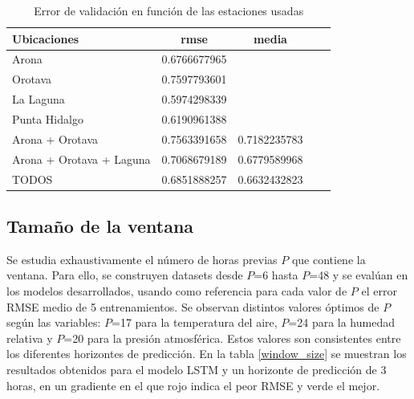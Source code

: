 \begin{table}[h!]
\centering
\begin{tabular}{lcccc}
\toprule
\textbf{Ubicaciones} & \textbf{rmse} & \textbf{media} \\
\midrule
Arona                    & 0.6766677965 & \\
Orotava                  & 0.7597793601 & \\
La Laguna                & 0.5974298339 & \\
Punta Hidalgo            & 0.6190961388 & \\
Arona + Orotava          & 0.7563391658 & 0.7182235783 \\
Arona + Orotava + Laguna & 0.7068679189 & 0.6779589968 \\
TODOS                    & 0.6851888257 & 0.6632432823 \\
\bottomrule
\end{tabular}
\caption{Error de validación en función de las estaciones usadas}
\label{estaciones_y_error}
\end{table}

\subsection{Tamaño de la ventana}
Se estudia exhaustivamente el número de horas previas $P$ que contiene la ventana. Para ello, se construyen datasets desde $P$=6 hasta $P$=48 y se evalúan en los modelos 
desarrollados, usando como referencia para cada valor de $P$ el error RMSE medio de 5 entrenamientos. Se observan distintos valores óptimos de $P$ según las variables: $P$=17 para la temperatura del aire, $P$=24 para la humedad relativa y 
$P$=20 para la presión atmosférica. Estos valores son consistentes entre los diferentes horizontes de predicción. En la tabla \ref{window_size} se muestran los resultados obtenidos para el modelo LSTM y un horizonte de predicción de 3 horas,
en un gradiente en el que rojo indica el peor RMSE y verde el mejor.

